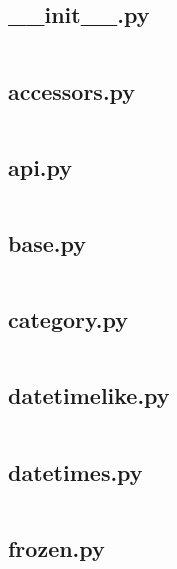 \documentclass{article}
\begin{document}
\subsection{\_\_init\_\_.py}
\inputminted{python}{/home/dufferzafar/dev/@clones/pandas/pandas/core/indexes/__init__.py}
\newpage

\subsection{accessors.py}
\inputminted{python}{/home/dufferzafar/dev/@clones/pandas/pandas/core/indexes/accessors.py}
\newpage

\subsection{api.py}
\inputminted{python}{/home/dufferzafar/dev/@clones/pandas/pandas/core/indexes/api.py}
\newpage

\subsection{base.py}
\inputminted{python}{/home/dufferzafar/dev/@clones/pandas/pandas/core/indexes/base.py}
\newpage

\subsection{category.py}
\inputminted{python}{/home/dufferzafar/dev/@clones/pandas/pandas/core/indexes/category.py}
\newpage

\subsection{datetimelike.py}
\inputminted{python}{/home/dufferzafar/dev/@clones/pandas/pandas/core/indexes/datetimelike.py}
\newpage

\subsection{datetimes.py}
\inputminted{python}{/home/dufferzafar/dev/@clones/pandas/pandas/core/indexes/datetimes.py}
\newpage

\subsection{frozen.py}
\inputminted{python}{/home/dufferzafar/dev/@clones/pandas/pandas/core/indexes/frozen.py}
\newpage
\end{document}
